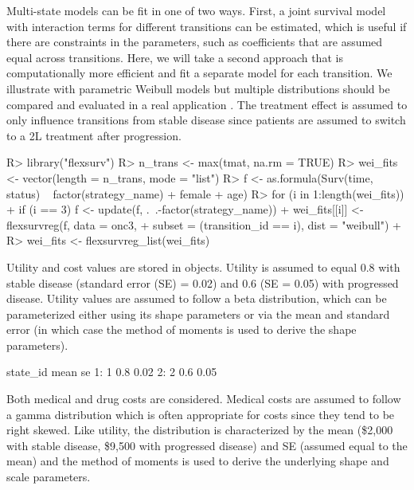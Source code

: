 \documentclass[article, nojss]{jss}\usepackage[]{graphicx}\usepackage[]{color}
\begin{document}
Multi-state models can be fit in one of two ways. First, a joint survival model with interaction terms for different transitions can be estimated, which is useful if there are constraints in the parameters, such as coefficients that are assumed equal across transitions. Here, we will take a second approach that is computationally more efficient and fit a separate model for each transition. We illustrate with parametric Weibull models but multiple distributions should be compared and evaluated in a real application \citep{williams2017cost}. The treatment effect is assumed to only influence transitions from stable disease since patients are assumed to switch to a 2L treatment after progression.

\begin{Schunk}
\begin{Sinput}
R> library("flexsurv")
R> n_trans <- max(tmat, na.rm = TRUE) 
R> wei_fits <- vector(length = n_trans, mode = "list")
R> f <- as.formula(Surv(time, status) ~ factor(strategy_name) + female + age)
R> for (i in 1:length(wei_fits)){
+    if (i == 3) f <- update(f, .~.-factor(strategy_name)) 
+    wei_fits[[i]] <- flexsurvreg(f, data = onc3, 
+      subset = (transition_id == i), dist = "weibull")
+  }
R> wei_fits <- flexsurvreg_list(wei_fits)
\end{Sinput}
\end{Schunk}

Utility and cost values are stored in  objects. Utility is assumed to equal 0.8 with stable disease (standard error (SE) = 0.02) and 0.6 (SE = 0.05) with progressed disease. Utility values are assumed to follow a beta distribution, which can be parameterized either using its shape parameters or via the mean and standard error (in which case the method of moments is used to derive the shape parameters).

\begin{Schunk}
\begin{Soutput}
   state_id mean   se
1:        1  0.8 0.02
2:        2  0.6 0.05
\end{Soutput}
\end{Schunk}

Both medical and drug costs are considered. Medical costs are assumed to follow a gamma distribution which is often appropriate for costs since they tend to be right skewed. Like utility, the distribution is characterized by the mean (\$2,000 with stable disease, \$9,500 with progressed disease) and SE (assumed equal to the mean) and the method of moments is used to derive the underlying shape and scale parameters.
\end{document}
